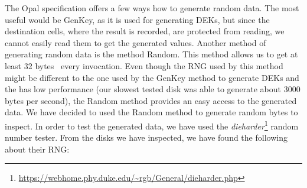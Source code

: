 The Opal specification offers a few ways how to generate random data. The most useful would be GenKey, as it is used for generating DEKs, but since the destination cells, where the result is recorded, are protected from reading, we cannot easily read them to get the generated values.
Another method of generating random data is the method Random. This method allows us to get at least 32 bytes~\cite{tcg-opal2} every invocation. Even though the RNG used by this method might be different to the one used by the GenKey method to generate DEKs and the has low performance (our slowest tested disk was able to generate about 3000 bytes per second), the Random method provides an easy access to the generated data.
We have decided to used the Random method to generate random bytes to inspect. In order to test the generated data, we have used the \emph{dieharder}\footnote{\url{https://webhome.phy.duke.edu/~rgb/General/dieharder.php}} random number tester.
From the disks we have inspected, we have found the following about their RNG:
